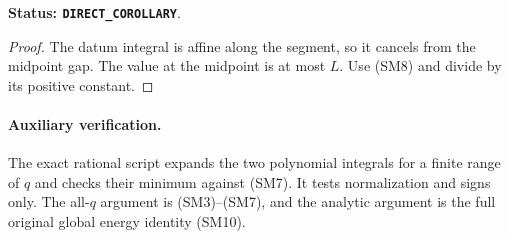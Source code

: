 \noindent\textbf{Status: \texttt{DIRECT\_COROLLARY}}.

\begin{proof}
The datum integral is affine along the segment,
so it cancels from the midpoint gap.
The value at the midpoint is at most $L$.
Use (SM8) and divide by its positive constant.
\end{proof}

\paragraph{Auxiliary verification.}
The exact rational script
expands the two polynomial integrals for a finite
range of $q$ and checks their minimum against (SM7).
It tests normalization and signs only.
The all-$q$ argument is (SM3)--(SM7), and the analytic
argument is the full original global energy identity
(SM10).

